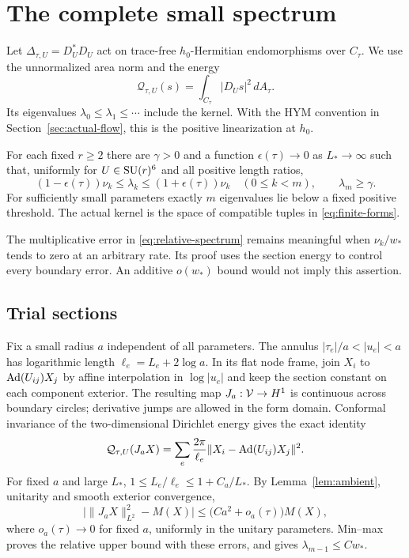 \section{The complete small spectrum}\label{sec:spectrum}

Let $\Delta_{\tau,U}=D_U^*D_U$ act on trace-free
$h_0$-Hermitian endomorphisms over $C_\tau$. We use the
unnormalized area norm and the energy
\[
 \mathcal Q_{\tau,U}(s)=\int_{C_\tau}|D_Us|^2\,dA_\tau.
\]
Its eigenvalues $\lambda_0\le\lambda_1\le\cdots$ include
the kernel. With the HYM convention in
Section~\ref{sec:actual-flow}, this is the positive
linearization at $h_0$.

\begin{theorem}\label{thm:spectrum}
For each fixed $r\ge2$ there are $\gamma>0$ and a
function $\epsilon(\tau)\to0$ as $L_*\to\infty$ such that,
uniformly for $U\in\operatorname{SU}(r)^6$ and all positive length ratios,
\begin{equation}\label{eq:relative-spectrum}
 (1-\epsilon(\tau))\nu_k\le\lambda_k
 \le(1+\epsilon(\tau))\nu_k\quad(0\le k<m),
 \qquad \lambda_m\ge\gamma .
\end{equation}
For sufficiently small parameters exactly $m$ eigenvalues
lie below a fixed positive threshold. The actual kernel
is the space of compatible tuples in
\eqref{eq:finite-forms}.
\end{theorem}

The multiplicative error in \eqref{eq:relative-spectrum}
remains meaningful when $\nu_k/w_*$ tends to zero at an
arbitrary rate. Its proof uses the section energy to
control every boundary error. An additive $o(w_*)$ bound
would not imply this assertion.

\subsection{Trial sections}
Fix a small radius $a$ independent of all parameters.
The annulus $|\tau_e|/a<|u_e|<a$ has logarithmic length
$\ell_e=L_e+2\log a$. In its flat node frame, join
$X_i$ to $\operatorname{Ad}(U_{ij})X_j$ by affine interpolation in
$\log|u_e|$ and keep the section constant on each
component exterior. The resulting map $J_a:\mathcal V\to H^1$
is continuous across boundary circles; derivative
jumps are allowed in the form domain. Conformal
invariance of the two-dimensional Dirichlet energy gives
the exact identity
\begin{equation}\label{eq:trial-energy}
 \mathcal Q_{\tau,U}(J_aX)
 =\sum_e\frac{2\pi}{\ell_e}
       \|X_i-\operatorname{Ad}(U_{ij})X_j\|^2.
\end{equation}
For fixed $a$ and large $L_*$,
$1\le L_e/\ell_e\le1+C_a/L_*$. By
Lemma~\ref{lem:ambient}, unitarity and smooth exterior
convergence,
\begin{equation}\label{eq:trial-mass}
 \big|\|J_aX\|_{L^2}^2-M(X)\big|
 \le\big(Ca^2+o_a(\tau)\big)M(X),
\end{equation}
where $o_a(\tau)\to0$ for fixed $a$, uniformly in the
unitary parameters. Min--max proves the relative upper
bound with these errors, and gives
$\lambda_{m-1}\le Cw_*$.

